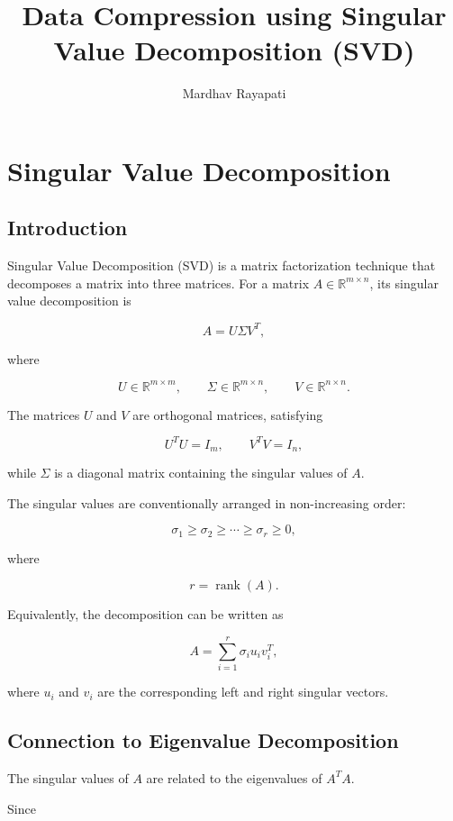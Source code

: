 \documentclass{article}
\title{Data Compression using Singular Value Decomposition (SVD)}
\author{Mardhav Rayapati}
\date{}
\begin{document}
\maketitle
\newpage

\section{Singular Value Decomposition}

\subsection{Introduction}

Singular Value Decomposition (SVD) is a matrix factorization technique
that decomposes a matrix into three matrices. For a matrix
$A \in \mathbb{R}^{m \times n}$, its singular value decomposition is

\[
    A = U \Sigma V^{T},
\]

where

\[
    U \in \mathbb{R}^{m \times m},
    \qquad
    \Sigma \in \mathbb{R}^{m \times n},
    \qquad
    V \in \mathbb{R}^{n \times n}.
\]

The matrices $U$ and $V$ are orthogonal matrices, satisfying

\[
    U^{T}U = I_m,
    \qquad
    V^{T}V = I_n,
\]

while $\Sigma$ is a diagonal matrix containing the singular values
of $A$.

The singular values are conventionally arranged in non-increasing
order:

\[
    \sigma_1 \geq \sigma_2 \geq \cdots \geq
    \sigma_r \geq 0,
\]

where

\[
    r = \operatorname{rank}(A).
\]

Equivalently, the decomposition can be written as

\[
    A =
    \sum_{i=1}^{r}
    \sigma_i u_i v_i^{T},
\]

where $u_i$ and $v_i$ are the corresponding left and right singular
vectors.

\subsection{Connection to Eigenvalue Decomposition}

The singular values of $A$ are related to the eigenvalues of
$A^{T}A$.

Since
\end{document}
